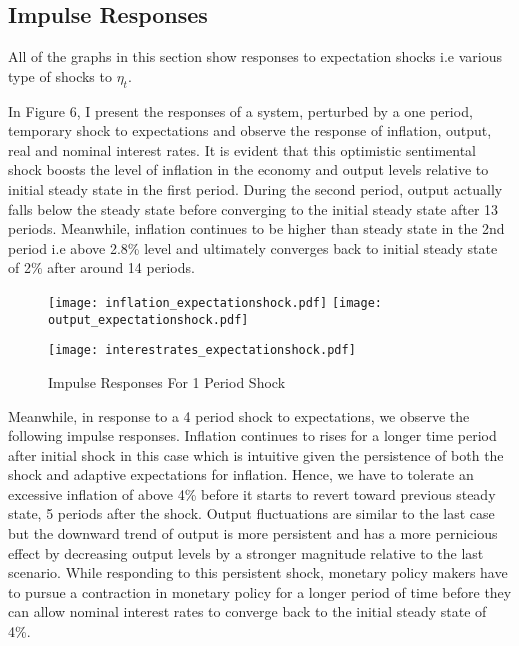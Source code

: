 \documentclass[12pt]{article}
\newcommand{\1}{\mathbbm 1}
\begin{document}
		
		
	
		
		\subsection{Impulse Responses}
		
		
		
		
		
	All of the graphs in this section show responses to expectation shocks i.e various type of shocks to $\eta_{t}$.
	
	In Figure 6, I present the responses of a system, perturbed by a one period, temporary shock to expectations and observe the response of inflation, output, real and nominal interest rates. It is evident that this optimistic sentimental shock boosts the level of inflation in the economy and output levels relative to initial steady state in the first period. During the second period, output actually falls below the steady state before converging to the initial steady state after 13 periods. Meanwhile, inflation continues to be higher than steady state in the 2nd period i.e above 2.8\% level and ultimately converges back to initial steady state of 2\% after around 14 periods.
		
		
		
		
		
		
		\begin{figure}[H]
				\texttt{[image: inflation\_expectationshock.pdf]}
				\hfill
				\texttt{[image: output\_expectationshock.pdf]}
				\hfill
				\begin{Center}
				\texttt{[image: interestrates\_expectationshock.pdf]}
				\end{Center}
				\caption{Impulse Responses For 1 Period Shock}
		\end{figure}
	
	Meanwhile, in response to a 4 period shock to expectations, we observe the following impulse responses. Inflation continues to rises for a longer time period after initial shock in this case which is intuitive given the persistence of both the shock and adaptive expectations for inflation. Hence, we have to tolerate an excessive inflation of above 4\% before it starts to revert toward previous steady state, 5 periods after the shock. Output fluctuations are similar to the last case but the downward trend of output is more persistent and has a more pernicious effect by decreasing output levels by a stronger magnitude relative to the last scenario. While responding to this persistent shock, monetary policy makers have to pursue a contraction in monetary policy for a longer period of time before they can allow nominal interest rates to converge back to the initial steady state of 4\%.
	
\end{document}
